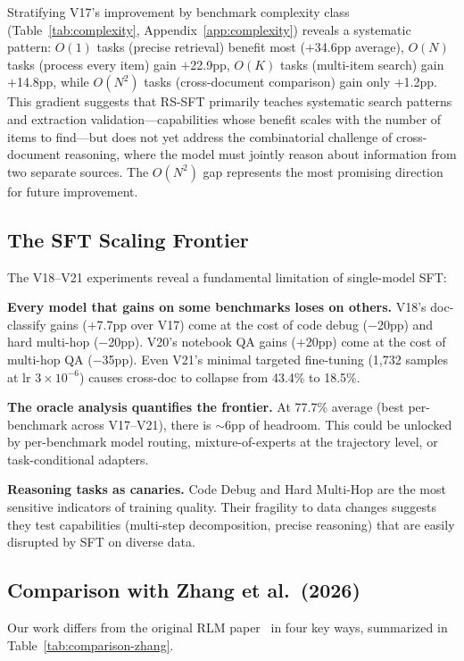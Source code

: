 \documentclass{article}
\begin{document}
Stratifying V17's improvement by benchmark complexity class (Table~\ref{tab:complexity}, Appendix~\ref{app:complexity}) reveals a systematic pattern: $O(1)$ tasks (precise retrieval) benefit most ($+$34.6pp average), $O(N)$ tasks (process every item) gain $+$22.9pp, $O(K)$ tasks (multi-item search) gain $+$14.8pp, while $O(N^2)$ tasks (cross-document comparison) gain only $+$1.2pp. This gradient suggests that RS-SFT primarily teaches systematic search patterns and extraction validation---capabilities whose benefit scales with the number of items to find---but does not yet address the combinatorial challenge of cross-document reasoning, where the model must jointly reason about information from two separate sources. The $O(N^2)$ gap represents the most promising direction for future improvement.

\subsection{The SFT Scaling Frontier}
\label{sec:frontier}

The V18--V21 experiments reveal a fundamental limitation of single-model SFT:

\textbf{Every model that gains on some benchmarks loses on others.} V18's doc-classify gains ($+$7.7pp over V17) come at the cost of code debug ($-$20pp) and hard multi-hop ($-$20pp). V20's notebook QA gains ($+$20pp) come at the cost of multi-hop QA ($-$35pp). Even V21's minimal targeted fine-tuning (1,732 samples at lr $3{\times}10^{-6}$) causes cross-doc to collapse from 43.4\% to 18.5\%.

\textbf{The oracle analysis quantifies the frontier.} At 77.7\% average (best per-benchmark across V17--V21), there is $\sim$6pp of headroom. This could be unlocked by per-benchmark model routing, mixture-of-experts at the trajectory level, or task-conditional adapters.

\textbf{Reasoning tasks as canaries.} Code Debug and Hard Multi-Hop are the most sensitive indicators of training quality. Their fragility to data changes suggests they test capabilities (multi-step decomposition, precise reasoning) that are easily disrupted by SFT on diverse data.

\subsection{Comparison with Zhang et al.\ (2026)}
\label{sec:comparison-zhang}

Our work differs from the original RLM paper~\cite{zhang2026rlm} in four key ways, summarized in Table~\ref{tab:comparison-zhang}.
\end{document}
